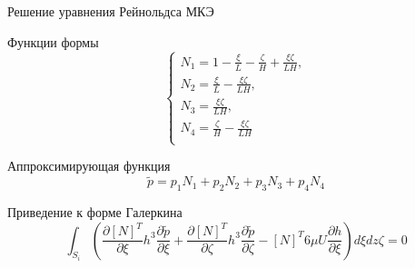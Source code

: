 \documentclass[ignoreonframetext,unicode]{beamer}
\begin{document}
\begin{frame}{Решение уравнения Рейнольдса МКЭ}
		



	\begin{block}{Функции формы}
		\[
			\begin{cases}
				N_1 = 1 - \frac{\xi}{L} - \frac{\zeta}{H} + \frac{\xi  \zeta}{L  H}, \\
				N_2 = \frac{\xi}{L} - \frac{\xi  \zeta}{L  H}, \\
				N_3 = \frac{\xi  \zeta}{L H}, \\
				N_4 = \frac{\zeta}{H} - \frac{\xi  \zeta}{L  H} \\
			\end{cases}
			\label{form-func}
		\]
	\end{block}


\begin{block}{Аппроксимирующая функция}
	\[
	\tilde{p} = p_1 N_1 + p_2 N_2 + p_3 N_3 + p_4 N_4
	\]
\end{block}

\begin{block}{Приведение к форме Галеркина}
	\begin{equation*}
		\int_{S_i} {\left( \frac{\partial[N]^T}{\partial \xi} h^3 \frac{\partial \tilde{p}}{\partial \xi}  +  \frac{\partial[N]^T}{\partial \zeta} h^3 \frac{\partial \tilde{p}}{\partial \zeta}  - [N]^T 6 \mu U \frac{\partial h}{\partial \xi}\right) d\xi dz\zeta} = 0
	\end{equation*}
\end{block}
	
\end{frame}
\end{document}
